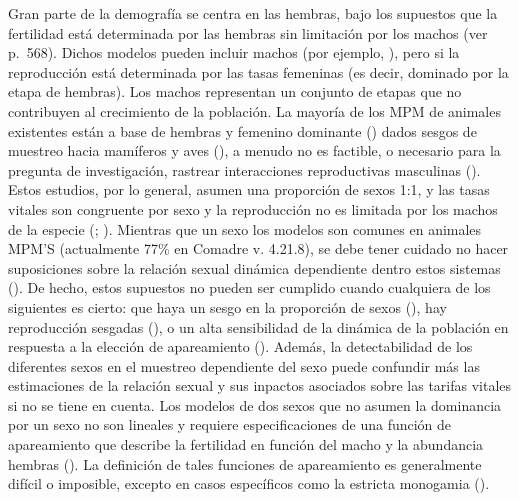 \documentclass[
]{book}
\theoremstyle{definition}
\theoremstyle{definition}
\theoremstyle{definition}
\theoremstyle{definition}
\theoremstyle{remark}
\begin{document}
Gran parte de la demografía se centra en las hembras, bajo los supuestos que la fertilidad está determinada por las hembras sin limitación por los machos (ver \citet{caswell2001matrix} p.~568). Dichos modelos pueden incluir machos (por ejemplo, \citet{hunter2010climate}), pero si la reproducción está determinada por las tasas femeninas (es decir, dominado por la etapa de hembras). Los machos representan un conjunto de etapas que no contribuyen al crecimiento de la población. La mayoría de los MPM de animales existentes están a base de hembras y femenino dominante (\citet{salguero2016comadre}) dados sesgos de muestreo hacia mamíferos y aves (\citet{conde2019data}), a menudo no es factible, o necesario para la pregunta de investigación, rastrear interacciones reproductivas masculinas (\citet{archer2022sex}). Estos estudios, por lo general, asumen una proporción de sexos 1:1, y las tasas vitales son congruente por sexo y la reproducción no es limitada por los machos de la especie (\citet{compagnoni2017can}; \citet{miller2022two}). Mientras que un sexo los modelos son comunes en animales MPM'S (actualmente 77\% en Comadre v. 4.21.8), se debe tener cuidado no hacer suposiciones sobre la relación sexual dinámica dependiente dentro estos sistemas (\citet{archer2022sex}). De hecho, estos supuestos no pueden ser cumplido cuando cualquiera de los siguientes es cierto: que haya un sesgo en la proporción de sexos (\citet{archer2022sex}), hay reproducción sesgadas (\citet{sky2022female}), o un alta sensibilidad de la dinámica de la población en respuesta a la elección de apareamiento (\citet{veran2009demographic}). Además, la detectabilidad de los diferentes sexos en el muestreo dependiente del sexo puede confundir más las estimaciones de la relación sexual y sus inpactos asociados sobre las tarifas vitales si no se tiene en cuenta. Los modelos de dos sexos que no asumen la dominancia por un sexo no son lineales y requiere especificaciones de una función de apareamiento que describe la fertilidad en función del macho y la abundancia hembras (\citet{caswell2001matrix}). La definición de tales funciones de apareamiento es generalmente difícil o imposible, excepto en casos específicos como la estricta monogamia (\citet{jenouvrier2010mating}).
\end{document}
